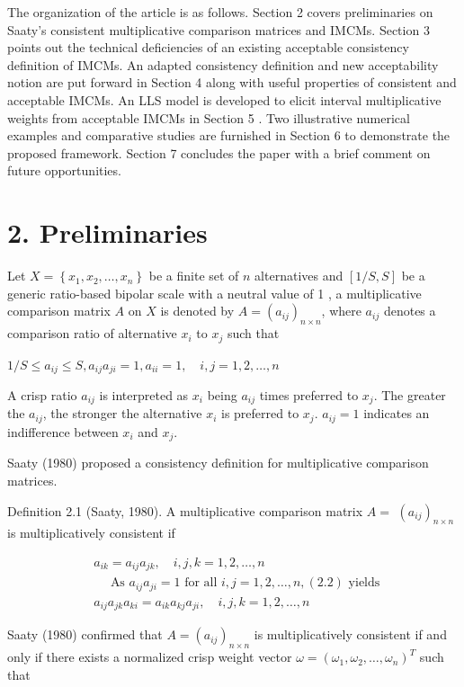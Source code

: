 \documentclass[10pt]{article}
\begin{document}
The organization of the article is as follows. Section 2 covers preliminaries on Saaty's consistent multiplicative comparison matrices and IMCMs. Section 3 points out the technical deficiencies of an existing acceptable consistency definition of IMCMs. An adapted consistency definition and new acceptability notion are put forward in Section 4 along with useful properties of consistent and acceptable IMCMs. An LLS model is developed to elicit interval multiplicative weights from acceptable IMCMs in Section 5 . Two illustrative numerical examples and comparative studies are furnished in Section 6 to demonstrate the proposed framework. Section 7 concludes the paper with a brief comment on future opportunities.

\section*{2. Preliminaries}
Let $X=\left\{x_{1}, x_{2}, \ldots, x_{n}\right\}$ be a finite set of $n$ alternatives and $[1 / S, S]$ be a generic ratio-based bipolar scale with a neutral value of 1 , a multiplicative comparison matrix $A$ on $X$ is denoted by $A=\left(a_{i j}\right)_{n \times n}$, where $a_{i j}$ denotes a comparison ratio of alternative $x_{i}$ to $x_{j}$ such that

$1 / S \leq a_{i j} \leq S, a_{i j} a_{j i}=1, a_{i i}=1, \quad i, j=1,2, \ldots, n$

A crisp ratio $a_{i j}$ is interpreted as $x_{i}$ being $a_{i j}$ times preferred to $x_{j}$. The greater the $a_{i j}$, the stronger the alternative $x_{i}$ is preferred to $x_{j}$. $a_{i j}=1$ indicates an indifference between $x_{i}$ and $x_{j}$.

Saaty (1980) proposed a consistency definition for multiplicative comparison matrices.

Definition 2.1 (Saaty, 1980). A multiplicative comparison matrix $A=$ $\left(a_{i j}\right)_{n \times n}$ is multiplicatively consistent if

$$
\begin{aligned}
& a_{i k}=a_{i j} a_{j k}, \quad i, j, k=1,2, \ldots, n \\
& \quad \text { As } a_{i j} a_{j i}=1 \text { for all } i, j=1,2, \ldots, n,(2.2) \text { yields } \\
& a_{i j} a_{j k} a_{k i}=a_{i k} a_{k j} a_{j i}, \quad i, j, k=1,2, \ldots, n
\end{aligned}
$$

Saaty (1980) confirmed that $A=\left(a_{i j}\right)_{n \times n}$ is multiplicatively consistent if and only if there exists a normalized crisp weight vector $\omega=\left(\omega_{1}, \omega_{2}, \ldots, \omega_{n}\right)^{T}$ such that
\end{document}
